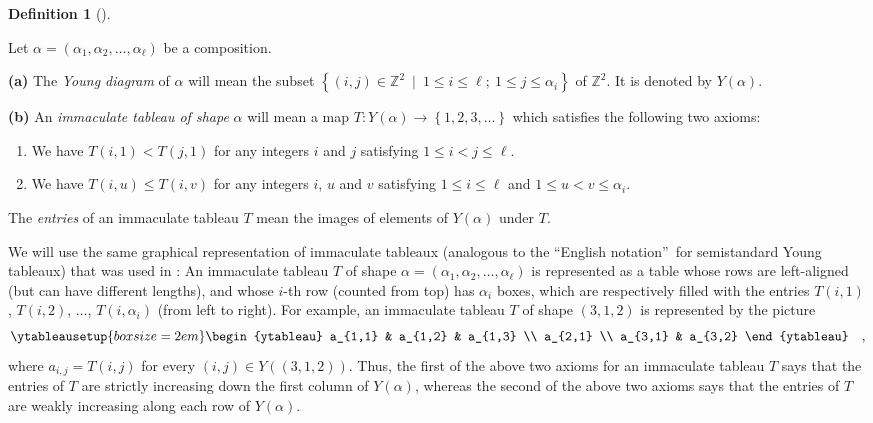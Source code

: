 \documentclass
[numbers=enddot,12pt,final,onecolumn,notitlepage,abstracton]{scrartcl}%
\theoremstyle{definition}
\newtheorem{defi}[theo]{Definition}
\newenvironment{definition}[1][]
{\begin{defi}[#1]\begin{leftbar}}
{\end{leftbar}\end{defi}}
\begin{document}
\Needspace{15cm}

\begin{definition}
\label{def.immactab}Let $\alpha=\left(  \alpha_{1},\alpha_{2},\ldots
,\alpha_{\ell}\right)  $ be a composition.

\textbf{(a)} The \textit{Young diagram} of $\alpha$ will mean the subset
$\left\{  \left(  i,j\right)  \in\mathbb{Z}^{2}\ \mid\ 1\leq i\leq\ell;\ 1\leq
j\leq\alpha_{i}\right\}  $ of $\mathbb{Z}^{2}$. It is denoted by $Y\left(
\alpha\right)  $.

\textbf{(b)} An \textit{immaculate tableau of shape }$\alpha$ will mean a map
$T:Y\left(  \alpha\right)  \rightarrow\left\{  1,2,3,\ldots\right\}  $ which
satisfies the following two axioms:

\begin{enumerate}
\item We have $T\left(  i,1\right)  <T\left(  j,1\right)  $ for any integers
$i$ and $j$ satisfying $1\leq i<j\leq\ell$.

\item We have $T\left(  i,u\right)  \leq T\left(  i,v\right)  $ for any
integers $i$, $u$ and $v$ satisfying $1\leq i\leq\ell$ and $1\leq
u<v\leq\alpha_{i}$.
\end{enumerate}

The \textit{entries} of an immaculate tableau $T$ mean the images of elements
of $Y\left(  \alpha\right)  $ under $T$.

We will use the same graphical representation of immaculate tableaux
(analogous to the \textquotedblleft English notation\textquotedblright\ for
semistandard Young tableaux) that was used in \cite{BBSSZ}: An immaculate
tableau $T$ of shape $\alpha=\left(  \alpha_{1},\alpha_{2},\ldots,\alpha
_{\ell}\right)  $ is represented as a table whose rows are left-aligned (but
can have different lengths), and whose $i$-th row (counted from top) has
$\alpha_{i}$ boxes, which are respectively filled with the entries $T\left(
i,1\right)  $, $T\left(  i,2\right)  $, $\ldots$, $T\left(  i,\alpha
_{i}\right)  $ (from left to right). For example, an immaculate tableau $T$ of
shape $\left(  3,1,2\right)  $ is represented by the picture%
\[
\ytableausetup{boxsize=2em} \begin{ytableau}
a_{1,1} & a_{1,2} & a_{1,3} \\
a_{2,1} \\
a_{3,1} & a_{3,2}
\end{ytableau}
\quad,
\]
where $a_{i,j}=T\left(  i,j\right)  $ for every $\left(  i,j\right)  \in
Y\left(  \left(  3,1,2\right)  \right)  $. Thus, the first of the above two
axioms for an immaculate tableau $T$ says that the entries of $T$ are strictly
increasing down the first column of $Y\left(  \alpha\right)  $, whereas the
second of the above two axioms says that the entries of $T$ are weakly
increasing along each row of $Y\left(  \alpha\right)  $.


\end{definition}
\end{document}
